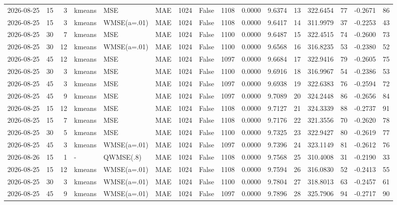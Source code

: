 \documentclass[10pt]{article}
\begin{document}
\begin{landscape}
\begin{longtable}{@{}lrrlllrcrrrrrrrr@{}}
2026-08-25 & 15 & 3 & kmeans & MSE & MAE & 1024 & False & 1108 & 0.0000 & 9.6374 & 13 & 322.6454 & 77 & -0.2671 & 86 \\
2026-08-25 & 15 & 3 & kmeans & WMSE(a=.01) & MAE & 1024 & False & 1108 & 0.0000 & 9.6417 & 14 & 311.9979 & 37 & -0.2253 & 43 \\
2026-08-25 & 30 & 7 & kmeans & MSE & MAE & 1024 & False & 1100 & 0.0000 & 9.6487 & 15 & 322.4515 & 74 & -0.2600 & 73 \\
2026-08-25 & 30 & 12 & kmeans & WMSE(a=.01) & MAE & 1024 & False & 1100 & 0.0000 & 9.6568 & 16 & 316.8235 & 53 & -0.2380 & 52 \\
2026-08-25 & 45 & 12 & kmeans & MSE & MAE & 1024 & False & 1097 & 0.0000 & 9.6684 & 17 & 322.9416 & 79 & -0.2605 & 75 \\
2026-08-25 & 30 & 3 & kmeans & MSE & MAE & 1024 & False & 1100 & 0.0000 & 9.6916 & 18 & 316.9967 & 54 & -0.2386 & 53 \\
2026-08-25 & 45 & 3 & kmeans & MSE & MAE & 1024 & False & 1097 & 0.0000 & 9.6938 & 19 & 322.6383 & 76 & -0.2594 & 72 \\
2026-08-25 & 45 & 9 & kmeans & MSE & MAE & 1024 & False & 1097 & 0.0000 & 9.7089 & 20 & 324.2448 & 86 & -0.2656 & 84 \\
2026-08-25 & 15 & 12 & kmeans & MSE & MAE & 1024 & False & 1108 & 0.0000 & 9.7127 & 21 & 324.3339 & 88 & -0.2737 & 91 \\
2026-08-25 & 15 & 7 & kmeans & MSE & MAE & 1024 & False & 1108 & 0.0000 & 9.7176 & 22 & 321.3556 & 70 & -0.2620 & 78 \\
2026-08-25 & 30 & 5 & kmeans & MSE & MAE & 1024 & False & 1100 & 0.0000 & 9.7325 & 23 & 322.9427 & 80 & -0.2619 & 77 \\
2026-08-25 & 45 & 3 & kmeans & WMSE(a=.01) & MAE & 1024 & False & 1097 & 0.0000 & 9.7396 & 24 & 323.1149 & 81 & -0.2612 & 76 \\
2026-08-26 & 15 & 1 & - & QWMSE(.8) & MAE & 1024 & False & 1108 & 0.0000 & 9.7568 & 25 & 310.4008 & 31 & -0.2190 & 33 \\
2026-08-25 & 15 & 12 & kmeans & WMSE(a=.01) & MAE & 1024 & False & 1108 & 0.0000 & 9.7594 & 26 & 316.0830 & 52 & -0.2413 & 55 \\
2026-08-25 & 30 & 3 & kmeans & WMSE(a=.01) & MAE & 1024 & False & 1100 & 0.0000 & 9.7804 & 27 & 318.8013 & 63 & -0.2457 & 61 \\
2026-08-25 & 45 & 9 & kmeans & WMSE(a=.01) & MAE & 1024 & False & 1097 & 0.0000 & 9.7896 & 28 & 325.7906 & 94 & -0.2717 & 90 \\

\end{longtable}
\end{landscape}
\end{document}
